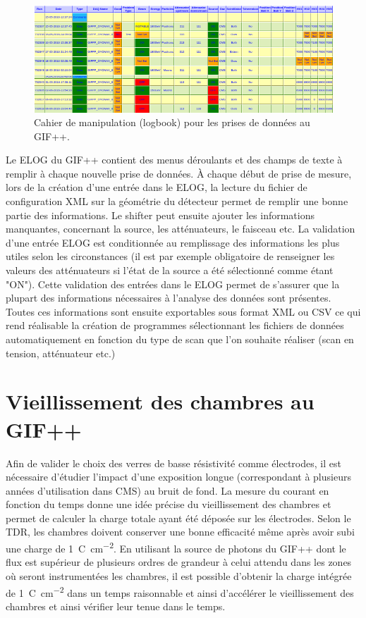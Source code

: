 \begin{figure}[!ht]
	\centering
	\includegraphics[width=0.75\linewidth]{GLA/ELOG2.png}
	\caption{Cahier de manipulation (logbook) pour les prises de données au GIF++.}
	\label{ELOG}
\end{figure}

Le ELOG du GIF++ contient des menus déroulants et des champs de texte à remplir à chaque nouvelle prise de données. À chaque début de prise de mesure, lors de la création d'une entrée dans le ELOG, la lecture du fichier de configuration XML sur la géométrie du détecteur permet de remplir une bonne partie des informations. Le shifter peut ensuite ajouter les informations manquantes, concernant la source, les atténuateurs, le faisceau etc. La validation d'une entrée ELOG est conditionnée au remplissage des informations les plus utiles selon les circonstances (il est par exemple obligatoire de renseigner les valeurs des atténuateurs si l'état de la source a été sélectionné comme étant "ON"). Cette validation des entrées dans le ELOG permet de s'assurer que la plupart des informations nécessaires à l'analyse des données sont présentes. Toutes ces informations sont ensuite exportables sous format XML ou CSV ce qui rend réalisable la création de programmes sélectionnant les fichiers de données automatiquement en fonction du type de scan que l'on souhaite réaliser (scan en tension, atténuateur etc.)
\vspace*{-0.2cm}
\section{Vieillissement des chambres au GIF++}
\vspace*{-0.4cm}
Afin de valider le choix des verres de basse résistivité comme électrodes, il est nécessaire d'étudier l'impact d'une exposition longue (correspondant à plusieurs années d'utilisation dans CMS) au bruit de fond. La mesure du courant en fonction du temps donne une idée précise du vieillissement des chambres et permet de calculer la charge totale ayant été déposée sur les électrodes. Selon le TDR, les chambres doivent conserver une bonne efficacité même après avoir subi une charge de \SI{1}{\coulomb\per\square\centi\meter}. En utilisant la source de photons du GIF++ dont le flux est supérieur de plusieurs ordres de grandeur à celui attendu dans les zones où seront instrumentées les chambres, il est possible d'obtenir la charge intégrée de \SI{1}{\coulomb\per\square\centi\meter} dans un temps raisonnable et ainsi d'accélérer le vieillissement des chambres et ainsi vérifier leur tenue dans le temps.

